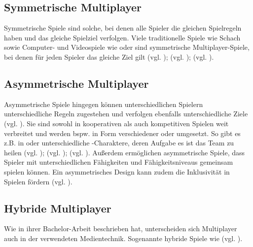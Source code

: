 \subsection{Symmetrische Multiplayer}
Symmetrische Spiele sind solche, bei denen alle Spieler die gleichen Spielregeln haben und das gleiche Spielziel verfolgen. Viele traditionelle Spiele wie Schach sowie Computer- und Videospiele wie  oder  sind symmetrische Multiplayer-Spiele, bei denen für jeden Spieler das gleiche Ziel gilt (vgl. \cite[S. 12]{adams_fundamentals_2013}); (vgl. \cite{noauthor_mario_nodate}); (vgl. \cite{noauthor_willkommen_nodate}). 


\subsection{Asymmetrische Multiplayer}
Asymmetrische Spiele hingegen können unterschiedlichen Spielern unterschiedliche Regeln zugestehen und verfolgen ebenfalls unterschiedliche Ziele (vgl. \cite[S. 12]{adams_fundamentals_2013}). Sie sind sowohl in kooperativen als auch kompetitiven Spielen weit verbreitet und werden bspw. in Form verschiedener  oder  umgesetzt. So gibt es z.B. in  oder   unterschiedliche -Charaktere, deren Aufgabe es ist das Team zu heilen (vgl. \cite{smilovitch_birdquestvr_2019}); (vgl. \cite{noauthor_league_2025}); (vgl. \cite{noauthor_overwatch_nodate}). 
Außerdem ermöglichen asymmetrische Spiele, dass Spieler mit unterschiedlichen Fähigkeiten und Fähigkeitsniveaus gemeinsam spielen können. Ein asymmetrisches Design kann zudem die Inklusivität in Spielen fördern (vgl. \cite{smilovitch_birdquestvr_2019}).

\subsection{Hybride Multiplayer}
Wie \cite[S. 6f]{lotz_konzeption_2021} in ihrer Bachelor-Arbeit beschrieben hat, unterscheiden sich Multiplayer auch in der verwendeten Medientechnik. Sogenannte hybride Spiele wie  (vgl. \cite{noauthor_mario_nodate-1}).

